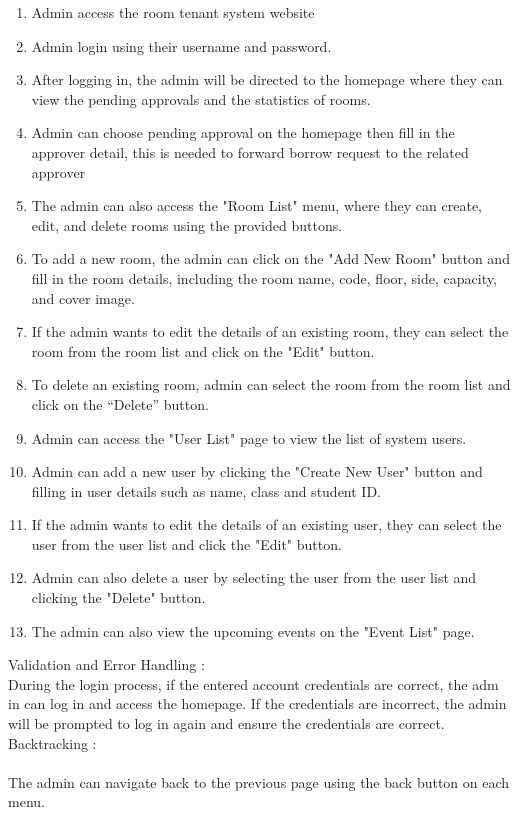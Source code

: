 \documentclass[12pt,titlepage,a4paper]{report}
\begin{document}
    \begin{enumerate}
        \item Admin access the room tenant system website
        \item Admin login using their username and password.
        \item After logging in, the admin will be directed to the homepage where they can view the pending approvals and the statistics of rooms.
        \item Admin can choose pending approval on the homepage then fill in the approver detail, this is needed to forward borrow request to the related approver
        \item The admin can also access the "Room List" menu, where they can create, edit, and delete rooms using the provided buttons.
        \item To add a new room, the admin can click on the "Add New Room" button and fill in the room details, including the room name, code, floor, side, capacity, and cover image.
        \item If the admin wants to edit the details of an existing room, they can select the room from the room list and click on the "Edit" button.
        \item To delete an existing room, admin can select the room from the room list and click on the “Delete” button.
        \item Admin can access the "User List" page to view the list of system users.
        \item Admin can add a new user by clicking the "Create New User" button and filling in user details such as name, class and student ID.
        \item If the admin wants to edit the details of an existing user, they can select the user from the user list and click the "Edit" button.
        \item Admin can also delete a user by selecting the user from the user list and clicking the "Delete" button.
        \item The admin can also view the upcoming events on the "Event List" page.
    \end{enumerate}
    Validation and Error Handling :\\
    During the login process, if the entered account credentials are correct, the adm\\in can log in and access the homepage. If the credentials are incorrect, the admin will be prompted to log in again and ensure the credentials are correct.\\
    Backtracking :\\\\
    The admin can navigate back to the previous page using the back button on each menu.
    \newpage
\end{document}
